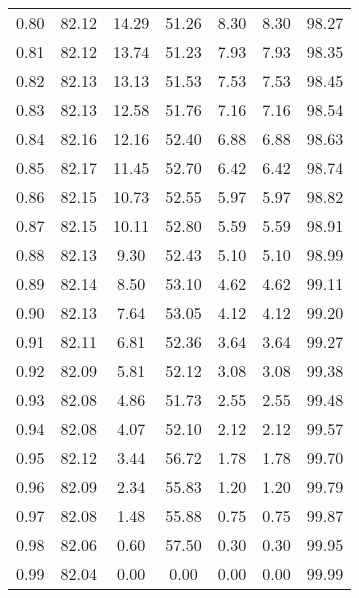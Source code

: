 \begin{tabular}{|c|c|c|c|c|c|c|}
      0.80 &     82.12 &     14.29 &      51.26 &    8.30 &       8.30 &         98.27 \\
      0.81 &     82.12 &     13.74 &      51.23 &    7.93 &       7.93 &         98.35 \\
      0.82 &     82.13 &     13.13 &      51.53 &    7.53 &       7.53 &         98.45 \\
      0.83 &     82.13 &     12.58 &      51.76 &    7.16 &       7.16 &         98.54 \\
      0.84 &     82.16 &     12.16 &      52.40 &    6.88 &       6.88 &         98.63 \\
      0.85 &     82.17 &     11.45 &      52.70 &    6.42 &       6.42 &         98.74 \\
      0.86 &     82.15 &     10.73 &      52.55 &    5.97 &       5.97 &         98.82 \\
      0.87 &     82.15 &     10.11 &      52.80 &    5.59 &       5.59 &         98.91 \\
      0.88 &     82.13 &      9.30 &      52.43 &    5.10 &       5.10 &         98.99 \\
      0.89 &     82.14 &      8.50 &      53.10 &    4.62 &       4.62 &         99.11 \\
      0.90 &     82.13 &      7.64 &      53.05 &    4.12 &       4.12 &         99.20 \\
      0.91 &     82.11 &      6.81 &      52.36 &    3.64 &       3.64 &         99.27 \\
      0.92 &     82.09 &      5.81 &      52.12 &    3.08 &       3.08 &         99.38 \\
      0.93 &     82.08 &      4.86 &      51.73 &    2.55 &       2.55 &         99.48 \\
      0.94 &     82.08 &      4.07 &      52.10 &    2.12 &       2.12 &         99.57 \\
      0.95 &     82.12 &      3.44 &      56.72 &    1.78 &       1.78 &         99.70 \\
      0.96 &     82.09 &      2.34 &      55.83 &    1.20 &       1.20 &         99.79 \\
      0.97 &     82.08 &      1.48 &      55.88 &    0.75 &       0.75 &         99.87 \\
      0.98 &     82.06 &      0.60 &      57.50 &    0.30 &       0.30 &         99.95 \\
      0.99 &     82.04 &      0.00 &       0.00 &    0.00 &       0.00 &         99.99 \\
\bottomrule
\end{tabular}
